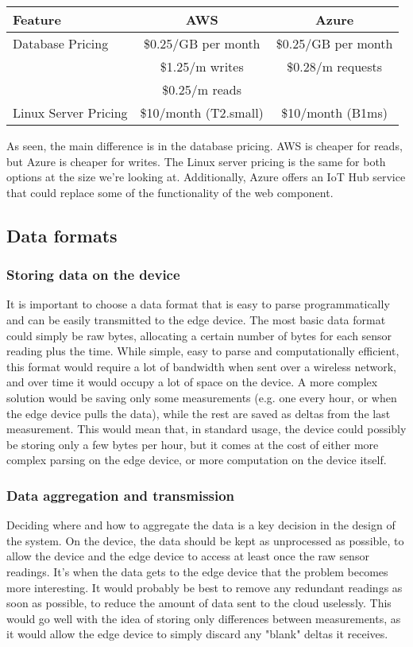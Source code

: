 \begin{table}[htbp]
    \centering
    \begin{tabularx}{\columnwidth}{|l|c|c|}
        \hline
        \textbf{Feature} & \textbf{AWS} & \textbf{Azure} \\
        \hline
        Database Pricing &
            \$0.25/GB per month & \$0.25/GB per month \\
         & \$1.25/m writes & \$0.28/m requests \\
         & \$0.25/m reads \\
        \hline
        Linux Server Pricing &
            \$10/month (T2.small) & 
            \$10/month (B1ms) \\
        \hline
        \end{tabularx}
\end{table}

As seen, the main difference is in the database pricing. AWS is cheaper for reads,
but Azure is cheaper for writes. The Linux server pricing is the same for both options
at the size we're looking at. Additionally, Azure offers an IoT Hub service that
could replace some of the functionality of the web component.
\subsection{Data formats}
\subsubsection*{Storing data on the device}
It is important to choose a data format that is easy to parse programmatically and
can be easily transmitted to the edge device. The most basic data format could simply
be raw bytes, allocating a certain number of bytes for each sensor reading plus the
time. While simple, easy to parse and computationally efficient, this format would
require a lot of bandwidth when sent over a wireless network, and over time it would
occupy a lot of space on the device. A more complex solution would be saving only some
measurements (e.g. one every hour, or when the edge device pulls the data), while
the rest are saved as deltas from the last measurement. This would mean that, in
standard usage, the device could possibly be storing only a few bytes per hour, but
it comes at the cost of either more complex parsing on the edge device, or more
computation on the device itself.
\subsubsection*{Data aggregation and transmission}
Deciding where and how to aggregate the data is a key decision in the design of the
system. On the device, the data should be kept as unprocessed as possible, to allow the device
and the edge device to access at least once the raw sensor readings. It's when the data
gets to the edge device that the problem becomes more interesting. It would probably
be best to remove any redundant readings as soon as possible, to reduce the amount of
data sent to the cloud uselessly. This would go well with the idea of storing only
differences between measurements, as it would allow the edge device to simply discard
any "blank" deltas it receives.

